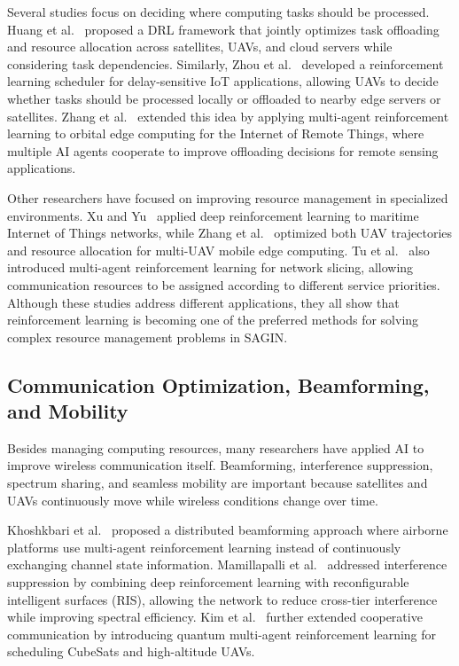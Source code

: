 \documentclass[letterpaper]{article} %
\begin{document}
Several studies focus on deciding where computing tasks should be processed. Huang et al.~\citep{huang2024joint} proposed a DRL framework that jointly optimizes task offloading and resource allocation across satellites, UAVs, and cloud servers while considering task dependencies. Similarly, Zhou et al.~\citep{Zhou2021IoTTaskScheduling} developed a reinforcement learning scheduler for delay-sensitive IoT applications, allowing UAVs to decide whether tasks should be processed locally or offloaded to nearby edge servers or satellites. Zhang et al.~\citep{zhang2023multiagent} extended this idea by applying multi-agent reinforcement learning to orbital edge computing for the Internet of Remote Things, where multiple AI agents cooperate to improve offloading decisions for remote sensing applications.

Other researchers have focused on improving resource management in specialized environments. Xu and Yu~\citep{xu2025deep} applied deep reinforcement learning to maritime Internet of Things networks, while Zhang et al.~\citep{zhang2025energy} optimized both UAV trajectories and resource allocation for multi-UAV mobile edge computing. Tu et al.~\citep{tu2024priority} also introduced multi-agent reinforcement learning for network slicing, allowing communication resources to be assigned according to different service priorities. Although these studies address different applications, they all show that reinforcement learning is becoming one of the preferred methods for solving complex resource management problems in SAGIN.

\subsection{Communication Optimization, Beamforming, and Mobility}

Besides managing computing resources, many researchers have applied AI to improve wireless communication itself. Beamforming, interference suppression, spectrum sharing, and seamless mobility are important because satellites and UAVs continuously move while wireless conditions change over time.

Khoshkbari et al.~\citep{khoshkbari2025distributed} proposed a distributed beamforming approach where airborne platforms use multi-agent reinforcement learning instead of continuously exchanging channel state information. Mamillapalli et al.~\citep{mamillapalli2026deep} addressed interference suppression by combining deep reinforcement learning with reconfigurable intelligent surfaces (RIS), allowing the network to reduce cross-tier interference while improving spectral efficiency. Kim et al.~\citep{kim2024quantum} further extended cooperative communication by introducing quantum multi-agent reinforcement learning for scheduling CubeSats and high-altitude UAVs.
\end{document}
